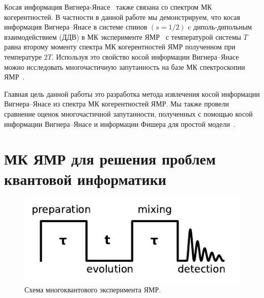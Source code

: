 \documentclass[preprint,12pt]{elsarticle}
\begin{document}
Косая информация Вигнера-Янасе~\cite{1,2,3,4} также связана со спектром МК когерентностей. 
В частности в данной работе мы демонстрируем, 
что косая информация Вигнера--Янасе в системе спинов $(s = 1/2)$ c диполь-дипольным взаимодействием (ДДВ) в МК эксперименте ЯМР~\cite{10} с температурой системы $T$ 
равна второму моменту спектра МК когерентностей ЯМР полученном при температуре $2T$. 
Используя это свойство косой информации Вигнера--Янасе можно исследовать многочастичную запутанность на базе МК спектроскопии ЯМР~\cite{10}.


Главная цель данной работы это разработка метода извлечения косой информации Вигнера--Янасе из спектра МК когерентностей ЯМР. 
Мы также провели сравнение оценок многочастичной запутанности, полученных с помощью косой информации Вигнера--Янасе и информации Фишера для простой модели~\cite{8,16}.  



\section{МК ЯМР для решения проблем квантовой информатики}
\label{sec:2}


\begin{figure}
	\includegraphics[width=0.95\linewidth]{mq-experiment}
	\caption{Схема многоквантового эксперимента ЯМР.}
	\label{fig:1}
\end{figure}
\end{document}
